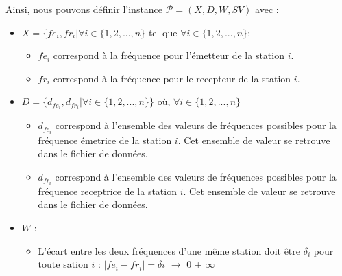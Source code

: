 \documentclass[a4paper, 10pt]{article}
\begin{document}
    Ainsi, nous pouvons définir l'instance $\mathcal{P} = (X, D, W, SV)$ avec :
    \begin{itemize}
      \item $X = \{ fe_i, fr_i | \forall i \in \{1,2,...,n\}$ tel que $\forall i \in \{1,2,...,n\}$:
            \begin{itemize}
              \item $fe_{i}$ correspond à la fréquence pour l'émetteur de la station $i$.
              \item $fr_{i}$ correspond à la fréquence pour le recepteur de la station $i$.
            \end{itemize}
      \item $D = \{d_{fe_i}, d_{fr_i} | \forall i \in \{1,2,...,n\} \}$ où, $\forall i \in \{1,2,...,n\}$
            \begin{itemize}
              \item $d_{fe_i}$ correspond à l'ensemble des valeurs de fréquences possibles pour la fréquence émetrice de la station $i$. Cet ensemble de valeur se retrouve dans le fichier de données.
              \item $d_{fr_i}$ correspond à l'ensemble des valeurs de fréquences possibles pour la fréquence receptrice de la station $i$. Cet ensemble de valeur se retrouve dans le fichier de données.
            \end{itemize}
      \item $W$ :
            \begin{itemize}
              \item L'écart entre les deux fréquences d'une même station doit être $\delta_{i}$ pour toute sation $i$ :
               $| fe_{i} - fr_{i} | = \delta{i}$ $\rightarrow$ \color{green} 0 \color{red} + $\infty$ \color{black}


\end{itemize}
\end{itemize}
\end{document}
